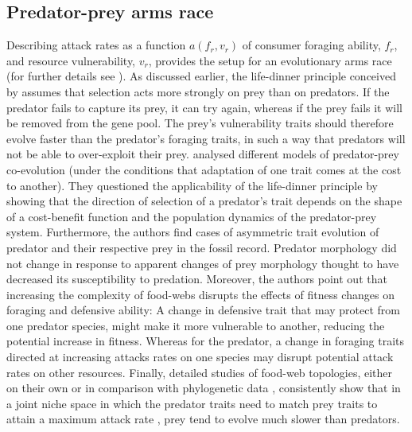\documentclass[a4paper]{report}
\begin{document}
\subsection{Predator-prey arms race \label{sec:arms_race}} Describing attack rates as a function $a(f_r,v_r)$ of consumer foraging ability, $f_r$, and resource vulnerability, $v_r$, provides the setup for an evolutionary arms race (for further details see \citep{rossberg09:_how_troph_inter_stren_depen_trait}). As discussed earlier, the life-dinner principle conceived by \citep{arms_race} assumes that selection acts more strongly on prey than on predators. If the predator fails to capture its prey, it can try again, whereas if the prey fails it will be removed from the gene pool. The prey’s vulnerability traits should therefore evolve faster than the predator’s foraging traits, in such a way that predators will not be able to over-exploit their prey. \citep{Abrams1986} analysed different models of predator-prey co-evolution (under the conditions that adaptation of one trait comes at the cost to another). They questioned the applicability of the life-dinner principle by showing that the direction of selection of a predator’s trait depends on the shape of a cost-benefit function and the population dynamics of the predator-prey system. Furthermore, the authors find cases of asymmetric trait evolution of predator and their respective prey in the fossil record. Predator morphology did not change in response to apparent changes of prey morphology thought to have decreased its susceptibility to predation. Moreover, the authors point out that increasing the complexity of food-webs disrupts the effects of fitness changes on foraging and defensive ability: A change in defensive trait that may protect from one predator species, might make it more vulnerable to another, reducing the potential increase in fitness. Whereas for the predator, a change in foraging traits directed at increasing attacks rates on one species may disrupt potential attack rates on other resources. Finally,  detailed studies of food-web topologies, either on their
own \citep{rossberg05:_props_with_corr} or in comparison with
phylogenetic data
\citep{bersier07:_signat_of_phylog_const_food_web_struc,
  Eklof16:_PhylogeneticComponent}, consistently show that in a joint
niche space in which the predator traits need to match prey traits to
attain a maximum attack rate
\citep{rossberg09:_how_troph_inter_stren_depen_trait}, prey tend to
evolve much slower than predators.\\
\end{document}
